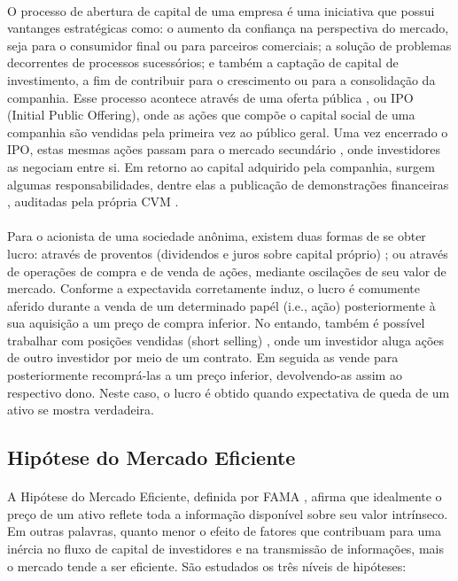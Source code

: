 \paragraph{} O processo de abertura de capital de uma empresa é uma iniciativa que possui vantanges estratégicas \cite{vantagens_sa} como: o aumento da confiança na perspectiva do mercado, seja para o consumidor final ou para parceiros comerciais; a solução de problemas decorrentes de processos sucessórios; e também a captação de capital de investimento, a fim de contribuir para o crescimento ou para a consolidação da companhia. Esse processo acontece através de uma oferta pública \cite{oferta_publica}, ou IPO (Initial Public Offering), onde as ações que compõe o capital social \cite{capital_social} de uma companhia são vendidas pela primeira vez ao público geral. Uma vez encerrado o IPO, estas mesmas ações passam para o mercado secundário \cite{mercado_secundario}, onde investidores as negociam entre si. Em retorno ao capital adquirido pela companhia, surgem algumas responsabilidades, dentre elas a publicação de demonstrações financeiras \cite{dem_finan}, auditadas pela própria CVM \cite{audi_dem_finan}.

\paragraph{} Para o acionista de uma sociedade anônima, existem duas formas de se obter lucro: através de proventos (dividendos e juros sobre capital próprio) \cite{proventos}; ou através de operações de compra e de venda de ações, mediante oscilações de seu valor de mercado. Conforme a expectavida corretamente induz, o lucro é comumente aferido durante a venda de um determinado papél (i.e., ação) posteriormente à sua aquisição a um preço de compra inferior. No entando, também é possível trabalhar com posições vendidas (short selling) \cite{short_selling}, onde um investidor aluga ações de outro investidor por meio de um contrato. Em seguida as vende para posteriormente recomprá-las a um preço inferior, devolvendo-as assim ao respectivo dono. Neste caso, o lucro é obtido quando expectativa de queda de um ativo se mostra verdadeira.

\subsection{Hipótese do Mercado Eficiente}

\paragraph{} A Hipótese do Mercado Eficiente, definida por FAMA \cite{fama1970efficient}, afirma que idealmente o preço de um ativo reflete toda a informação disponível sobre seu valor intrínseco. Em outras palavras, quanto menor o efeito de fatores que contribuam para uma inércia no fluxo de capital de investidores e na transmissão de informações, mais o mercado tende a ser eficiente. São estudados os três níveis de hipóteses:

